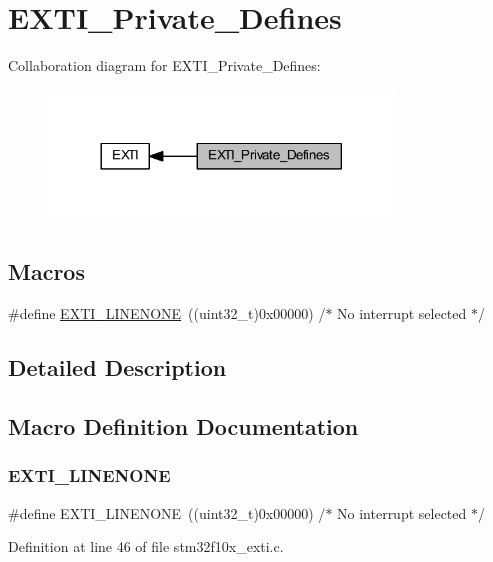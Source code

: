 \hypertarget{group___e_x_t_i___private___defines}{}\section{E\+X\+T\+I\+\_\+\+Private\+\_\+\+Defines}
\label{group___e_x_t_i___private___defines}
Collaboration diagram for E\+X\+T\+I\+\_\+\+Private\+\_\+\+Defines\+:
\nopagebreak
\begin{figure}[H]
\begin{center}
\leavevmode
\includegraphics[width=260pt]{group___e_x_t_i___private___defines}
\end{center}
\end{figure}
\subsection*{Macros}
\begin{DoxyCompactItemize}
\item 
\#define \hyperlink{group___e_x_t_i___private___defines_ga4451b67e337fc341394ee695273798af}{E\+X\+T\+I\+\_\+\+L\+I\+N\+E\+N\+O\+NE}~((uint32\+\_\+t)0x00000)  /$\ast$ No interrupt selected $\ast$/
\end{DoxyCompactItemize}


\subsection{Detailed Description}


\subsection{Macro Definition Documentation}
\mbox{\label{group___e_x_t_i___private___defines_ga4451b67e337fc341394ee695273798af}} 
\subsubsection{\texorpdfstring{E\+X\+T\+I\+\_\+\+L\+I\+N\+E\+N\+O\+NE}{EXTI\_LINENONE}}
{\footnotesize\ttfamily \#define E\+X\+T\+I\+\_\+\+L\+I\+N\+E\+N\+O\+NE~((uint32\+\_\+t)0x00000)  /$\ast$ No interrupt selected $\ast$/}



Definition at line 46 of file stm32f10x\+\_\+exti.\+c.

